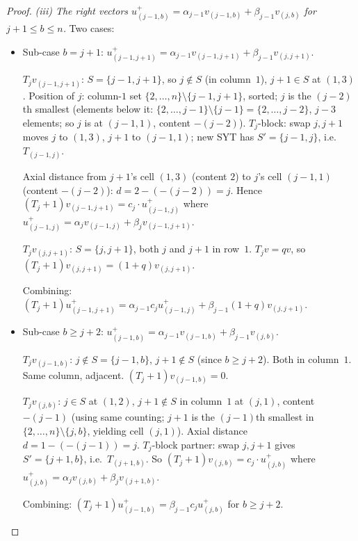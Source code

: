 \documentclass[11pt]{article}
\theoremstyle{definition}
\begin{document}
\begin{proof}
\emph{(iii) The right vectors $u^+_{(j-1,b)}=\alpha_{j-1}v_{(j-1,b)}+
\beta_{j-1}v_{(j,b)}$ for $j+1\le b\le n$.}  Two cases:
\begin{itemize}[leftmargin=2em,topsep=0.3em,itemsep=0.2em]
\item Sub-case $b=j+1$: $u^+_{(j-1,j+1)}=\alpha_{j-1}v_{(j-1,j+1)}+
\beta_{j-1}v_{(j,j+1)}$.

  $T_jv_{(j-1,j+1)}$: $S=\{j-1,j+1\}$, so $j\notin S$ (in column~$1$),
  $j+1\in S$ at $(1,3)$.  Position of $j$: column-$1$ set
  $\{2,\ldots,n\}\setminus\{j-1,j+1\}$, sorted; $j$ is the $(j-2)$th
  smallest (elements below it: $\{2,\ldots,j-1\}\setminus\{j-1\}=\{2,\ldots,j-2\}$,
  $j-3$ elements; so $j$ is at $(j-1,1)$, content $-(j-2)$).
  $T_j$-block: swap $j,j+1$ moves $j$ to $(1,3)$, $j+1$ to $(j-1,1)$;
  new SYT has $S'=\{j-1,j\}$, i.e.\ $T_{(j-1,j)}$.

  Axial distance from $j+1$'s cell $(1,3)$ (content $2$) to $j$'s cell
  $(j-1,1)$ (content $-(j-2)$): $d=2-(-(j-2))=j$.  Hence
  $(T_j{+}1)v_{(j-1,j+1)} = c_j\cdot u^+_{(j-1,j)}$ where
  $u^+_{(j-1,j)} = \alpha_j v_{(j-1,j)} + \beta_j v_{(j-1,j+1)}$.

  $T_jv_{(j,j+1)}$: $S=\{j,j+1\}$, both $j$ and $j+1$ in row~$1$.
  $T_jv=qv$, so $(T_j{+}1)v_{(j,j+1)}=(1+q)v_{(j,j+1)}$.

  Combining: $(T_j{+}1)u^+_{(j-1,j+1)} =
  \alpha_{j-1}c_j u^+_{(j-1,j)} + \beta_{j-1}(1+q)v_{(j,j+1)}$.

\item Sub-case $b\ge j+2$: $u^+_{(j-1,b)}=\alpha_{j-1}v_{(j-1,b)}+
\beta_{j-1}v_{(j,b)}$.

  $T_jv_{(j-1,b)}$: $j\notin S=\{j-1,b\}$, $j+1\notin S$ (since $b\ge j+2$).
  Both in column~$1$.  Same column, adjacent.  $(T_j{+}1)v_{(j-1,b)}=0$.

  $T_jv_{(j,b)}$: $j\in S$ at $(1,2)$, $j+1\notin S$ in column~$1$ at
  $(j,1)$, content $-(j-1)$ (using same counting; $j+1$ is the
  $(j-1)$th smallest in $\{2,\ldots,n\}\setminus\{j,b\}$, yielding cell
  $(j,1)$).  Axial distance $d=1-(-(j-1))=j$.  $T_j$-block partner:
  swap $j,j+1$ gives $S'=\{j+1,b\}$, i.e.\ $T_{(j+1,b)}$.  So
  $(T_j{+}1)v_{(j,b)} = c_j\cdot u^+_{(j,b)}$ where
  $u^+_{(j,b)} = \alpha_j v_{(j,b)} + \beta_j v_{(j+1,b)}$.

  Combining: $(T_j{+}1)u^+_{(j-1,b)} = \beta_{j-1}c_j u^+_{(j,b)}$ for
  $b\ge j+2$.
\end{itemize}


\end{proof}
\end{document}

